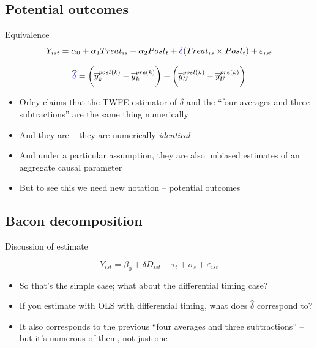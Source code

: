 \documentclass{beamer}
\begin{document}
\subsection{Potential outcomes}

\begin{frame}{Equivalence}
$$Y_{ist} = \alpha_0 + \alpha_1 Treat_{is} + \alpha_2 Post_{t} + \textcolor{blue}{\delta} (Treat_{is} \times Post_t) + \varepsilon_{ist} $$

\bigskip

$$\widehat{\textcolor{blue}{\delta}} = \bigg ( \overline{y}_k^{post(k)} - \overline{y}_k^{pre(k)} \bigg ) - \bigg ( \overline{y}_U^{post(k)} - \overline{y}_U^{pre(k)} \bigg ) $$

\begin{itemize}
\item Orley claims that the TWFE estimator of $\delta$ and the ``four averages and three subtractions'' are the same thing numerically
\item And they are -- they are numerically \emph{identical}
\item And under a particular assumption, they are also unbiased estimates of an aggregate causal parameter
\item But to see this we need new notation -- potential outcomes
\end{itemize}

\end{frame}


















\subsection{Bacon decomposition}

\begin{frame}{Discussion of estimate}


$$Y_{ist} = \beta_0 + \delta D_{ist} + \tau_t + \sigma_s + \varepsilon_{ist}$$


\begin{itemize}
\item So that's the simple case; what about the differential timing case?  

\item If you estimate with OLS with differential timing, what does $\widehat{\delta}$ correspond to?
\item It also corresponds to the previous ``four averages and three subtractions'' -- but it's numerous of them, not just one

\end{itemize}

\end{frame}
\end{document}
